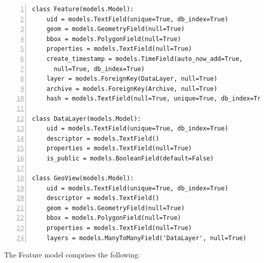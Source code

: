 \begin{Verbatim}[samepage=true,baselinestretch=1,numbers=left,xleftmargin=12mm]
class Feature(models.Model):
    uid = models.TextField(unique=True, db_index=True)
    geom = models.GeometryField(null=True)
    bbox = models.PolygonField(null=True)
    properties = models.TextField(null=True)
    create_timestamp = models.TimeField(auto_now_add=True,
      null=True, db_index=True)
    layer = models.ForeignKey(DataLayer, null=True)
    archive = models.ForeignKey(Archive, null=True)
    hash = models.TextField(null=True, unique=True, db_index=True)
    
class DataLayer(models.Model):
    uid = models.TextField(unique=True, db_index=True)
    descriptor = models.TextField()
    properties = models.TextField(null=True)
    is_public = models.BooleanField(default=False)
    
class GeoView(models.Model):
    uid = models.TextField(unique=True, db_index=True)
    descriptor = models.TextField()
    geom = models.GeometryField(null=True)
    bbox = models.PolygonField(null=True)
    properties = models.TextField(null=True)
    layers = models.ManyToManyField('DataLayer', null=True)
\end{Verbatim}

The Feature model comprises the following:

